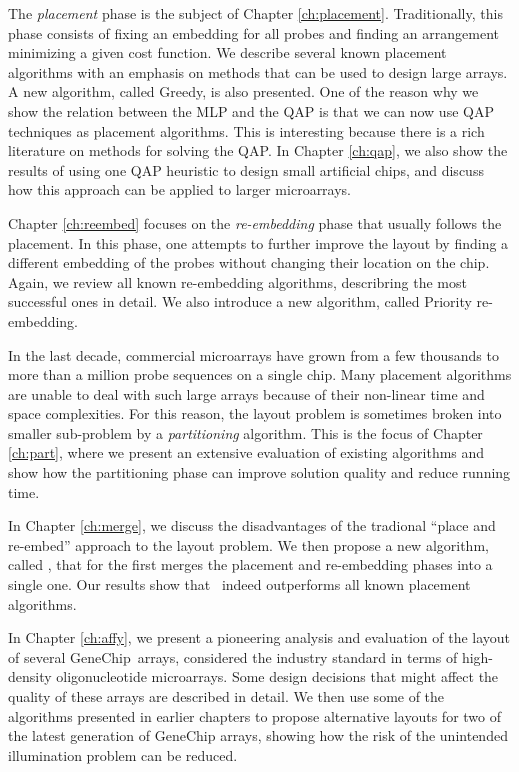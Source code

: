 The \emph{placement} phase is the subject of Chapter \ref{ch:placement}.
Traditionally, this phase consists of fixing an embedding for all probes and
finding an arrangement minimizing a given cost function. We describe several
known placement algorithms with an emphasis on methods that can be used to
design large arrays. A new algorithm, called Greedy, is also presented. One of
the reason why we show the relation between the MLP and the QAP is that we can
now use QAP techniques as placement algorithms. This is interesting because
there is a rich literature on methods for solving the QAP. In Chapter
\ref{ch:qap}, we also show the results of using one QAP heuristic to design
small artificial chips, and discuss how this approach can be applied to larger
microarrays.

Chapter \ref{ch:reembed} focuses on the \emph{re-embedding} phase that usually
follows the placement. In this phase, one attempts to further improve the layout
by finding a different embedding of the probes without changing their location
on the chip. Again, we review all known re-embedding algorithms, describring the
most successful ones in detail. We also introduce a new algorithm, called
Priority re-embedding.

In the last decade, commercial microarrays have grown from a few thousands to
more than a million probe sequences on a single chip. Many placement algorithms
are unable to deal with such large arrays because of their non-linear time and
space complexities. For this reason, the layout problem is sometimes broken into
smaller sub-problem by a \emph{partitioning} algorithm. This is the focus of
Chapter \ref{ch:part}, where we present an extensive evaluation of existing
algorithms and show how the partitioning phase can improve solution quality and
reduce running time.

In Chapter \ref{ch:merge}, we discuss the disadvantages of the tradional ``place
and re-embed'' approach to the layout problem. We then propose a new algorithm,
called \Greedyplus, that for the first merges the placement and re-embedding
phases into a single one. Our results show that \Greedyplus\ indeed outperforms
all known placement algorithms.

In Chapter \ref{ch:affy}, we present a pioneering analysis and evaluation of the
layout of several GeneChip\textR\ arrays, considered the industry standard in
terms of high-density oligonucleotide microarrays. Some design decisions that
might affect the quality of these arrays are described in detail. We then use
some of the algorithms presented in earlier chapters to propose alternative
layouts for two of the latest generation of GeneChip arrays, showing how the
risk of the unintended illumination problem can be reduced.

